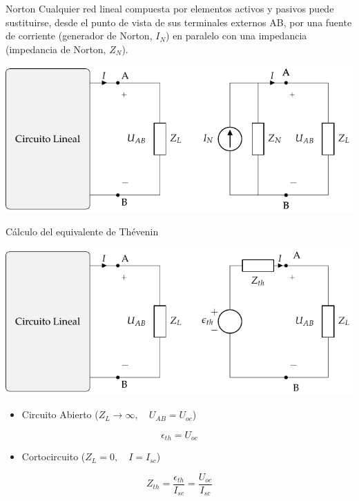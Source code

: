 \documentclass[xcolor={usenames,svgnames,dvipsnames}]{beamer}
\begin{document}
\begin{frame}[label={sec:orgd278d9f}]{Norton}
Cualquier \alert{red lineal} compuesta por elementos activos y pasivos puede sustituirse, desde el punto de vista de sus terminales externos AB, por una \alert{fuente de corriente} (generador de Norton, \(I_N\)) en \alert{paralelo} con una impedancia (impedancia de Norton, \(Z_N\)).

\begin{center}
\includegraphics[width=.9\linewidth]{figs/EquivalenteNorton.pdf}
\end{center}
\end{frame}

\begin{frame}[label={sec:orgd0b4ebc}]{Cálculo del equivalente de Thévenin}
\begin{center}
\includegraphics[width=.9\linewidth]{figs/EquivalenteThevenin.pdf}
\end{center}

\begin{itemize}
\item Circuito Abierto (\(Z_L \to \infty, \quad U_{AB} = U_{oc}\))
\end{itemize}
\[
\boxed{\epsilon_{th} = U_{oc}}
\]
\begin{itemize}
\item Cortocircuito (\(Z_L = 0, \quad I = I_{sc}\))
\end{itemize}
\[
\boxed{Z_{th} = \frac{\epsilon_{th}}{I_{sc}} = \frac{U_{oc}}{I_{sc}}}
\]
\end{frame}
\end{document}
